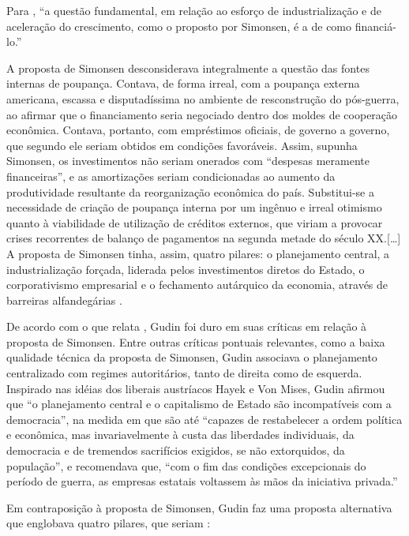 \documentclass[
	10pt,				%
	openright,			%
	twoside,			%
	a5paper,			%
	english,			%
	french,				%
	spanish,			%
	brazil				%
	]{abntex2}
\renewenvironment{quote}
  {\small\list{}{\rightmargin=0.1cm \leftmargin=4cm}%
   \item\relax}
  {\endlist}
\begin{document}
Para , ``a questão fundamental, em
relação ao esforço de industrialização e de aceleração do crescimento,
como o proposto por Simonsen, é a de como financiá-lo.''

\begin{quote}
A proposta de Simonsen desconsiderava integralmente a questão das fontes
internas de poupança. Contava, de forma irreal, com a poupança externa
americana, escassa e disputadíssima no ambiente de resconstrução do
pós-guerra, ao afirmar que o financiamento seria negociado dentro dos
moldes de cooperação econômica. Contava, portanto, com empréstimos
oficiais, de governo a governo, que segundo ele seriam obtidos em
condições favoráveis. Assim, supunha Simonsen, os investimentos não
seriam onerados com ``despesas meramente financeiras'', e as
amortizações seriam condicionadas ao aumento da produtividade resultante
da reorganização econômica do país. Substitui-se a necessidade de
criação de poupança interna por um ingênuo e irreal otimismo quanto à
viabilidade de utilização de créditos externos, que viriam a provocar
crises recorrentes de balanço de pagamentos na segunda metade do século
XX.{[}\ldots{}{]} A proposta de Simonsen tinha, assim, quatro pilares: o
planejamento central, a industrialização forçada, liderada pelos
investimentos diretos do Estado, o corporativismo empresarial e o
fechamento autárquico da economia, através de barreiras alfandegárias
\cite[p.~24]{resende2017}.
\end{quote}

De acordo com o que relata , Gudin foi
duro em suas críticas em relação à proposta de Simonsen. Entre outras
críticas pontuais relevantes, como a baixa qualidade técnica da proposta
de Simonsen, Gudin associava o planejamento centralizado com regimes
autoritários, tanto de direita como de esquerda. Inspirado nas idéias
dos liberais austríacos Hayek e Von Mises, Gudin afirmou que ``o
planejamento central e o capitalismo de Estado são incompatíveis com a
democracia'', na medida em que são até ``capazes de restabelecer a ordem
política e econômica, mas invariavelmente à custa das liberdades
individuais, da democracia e de tremendos sacrifícios exigidos, se não
extorquidos, da população'', e recomendava que, ``com o fim das
condições excepcionais do período de guerra, as empresas estatais
voltassem às mãos da iniciativa privada.''

Em contraposição à proposta de Simonsen, Gudin faz uma proposta
alternativa que englobava quatro pilares, que seriam
\cite[p.~29-30]{resende2017}:
\end{document}
